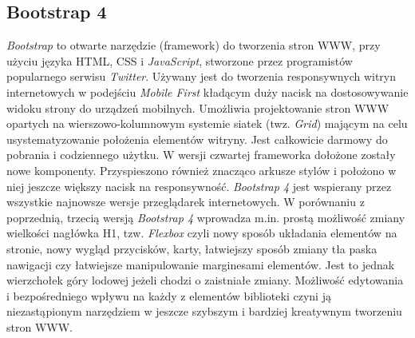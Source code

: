 \subsection{Bootstrap 4}
\textit{Bootstrap} to otwarte narzędzie (framework) do tworzenia stron WWW, przy użyciu języka HTML, CSS i \textit{JavaScript}, stworzone przez programistów popularnego serwisu \textit{Twitter}. Używany jest do tworzenia responsywnych witryn internetowych w podejściu \textit{Mobile First} kładącym duży nacisk na dostosowywanie widoku strony do urządzeń mobilnych. Umożliwia projektowanie stron WWW opartych na wierszowo-kolumnowym systemie siatek (twz. \textit{Grid}) mającym na celu usystematyzowanie położenia elementów witryny. Jest całkowicie darmowy do pobrania i codziennego użytku. W wersji czwartej frameworka dołożone zostały nowe komponenty. Przyspieszono również znacząco arkusze stylów i położono w niej jeszcze większy nacisk na responsywność. \textit{Bootstrap 4} jest wspierany przez wszystkie najnowsze wersje przeglądarek internetowych. W porównaniu z poprzednią, trzecią wersją \textit{Bootstrap 4} wprowadza m.in. prostą możliwość zmiany wielkości nagłówka H1, tzw. \textit{Flexbox} czyli nowy sposób układania elementów na stronie, nowy wygląd przycisków, karty, łatwiejszy sposób zmiany tła paska nawigacji czy łatwiejsze manipulowanie marginesami elementów. Jest to jednak wierzchołek góry lodowej jeżeli chodzi o zaistniałe zmiany. Możliwość edytowania i bezpośredniego wpływu na każdy z elementów biblioteki czyni ją niezastąpionym narzędziem w jeszcze szybszym i bardziej kreatywnym tworzeniu stron WWW. \cite{Bootstrap}

